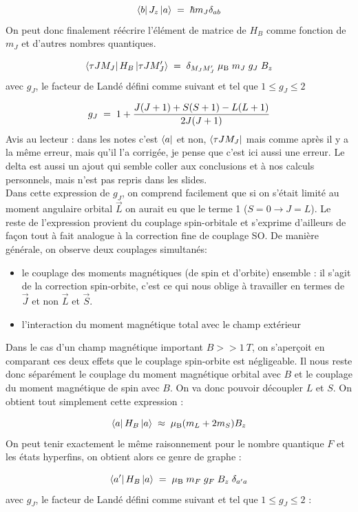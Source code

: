 \[
    \bra{b}J_z\ket{a} \; = \; \hbar m_J \delta_{ab}
\]
On peut donc finalement réécrire l'élément de matrice de $H_B$ comme fonction de $m_J$ et d'autres nombres quantiques.

\[
    \bra{\tau J M_J}H_B\ket{\tau J M'_J} \; = \; \delta_{M_J M'_J} \;\mu_\text{B} \; m_J \; g_J \; B_z
\]
avec $g_J$, le facteur de Landé défini comme suivant et tel que $1\leq g_J \leq 2$

\[
    g_J \; = \;  1 + \dfrac{J(J+1) + S(S+1) - L(L+1)}{2J(J+1)}
\]
Avis au lecteur : dans les notes c'est $\bra{a}$ et non, $\bra{\tau J M_J}$ mais comme après il y a la même erreur, mais qu'il l'a corrigée, je pense que c'est ici aussi une erreur. Le delta est aussi un ajout qui semble coller aux conclusions et à nos calculs personnels, mais n'est pas repris dans les slides.\\

Dans cette expression de $g_J$, on comprend facilement que si on s'était limité au moment angulaire orbital $\vec{L}$ on aurait eu que le terme 1 ($S=0 \rightarrow J=L$). Le reste de l'expression provient du couplage spin-orbitale et s'exprime d'ailleurs de façon tout à fait analogue à la correction fine de couplage SO. De manière générale, on observe deux couplages simultanés:
\begin{itemize}[label=$\bullet$]
    \item le couplage des moments magnétiques (de spin et d'orbite) ensemble : il s'agit de la correction spin-orbite, c'est ce qui nous oblige à travailler en termes de $\vec{J}$ et non $\vec{L}$ et $\vec{S}$.
    \item l'interaction du moment magnétique total avec le champ extérieur
\end{itemize}
Dans le cas d'un champ magnétique important $B>>\SI{1}{T}$, on s'aperçoit en comparant ces deux effets que le couplage spin-orbite est négligeable. Il nous reste donc séparément le couplage du moment magnétique orbital avec $B$ et le couplage du moment magnétique de spin avec $B$. On va donc pouvoir découpler $L$ et $S$. On obtient tout simplement cette expression :

\[
    \bra{a}H_B\ket{a} \; \approx \; \mu_\text{B}(m_L + 2m_S)B_z
\]
On peut tenir exactement le même raisonnement pour le nombre quantique $F$ et les états hyperfins, on obtient alors ce genre de graphe :

\[
    \bra{a'}H_B\ket{a} \; = \; \mu_\text{B} \; m_F \; g_F \; B_z \;\delta_{a'a}
\]
avec $g_J$, le facteur de Landé défini comme suivant et tel que $1\leq g_J \leq 2$ :

